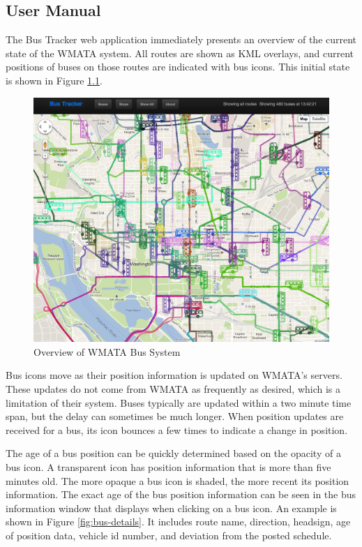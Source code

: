 \documentclass[12pt]{report}
\begin{document}
\begin{appendices}
\chapter{User Manual}

The Bus Tracker web application immediately presents an overview of the current state of the WMATA system.  All routes are shown as KML overlays, and current positions of buses on those routes are indicated with bus icons.  This initial state is shown in Figure \ref{fig:busOverview}.

\begin{figure}[ht]
  \centerline{\includegraphics[width=\textwidth]{bus-tracker-overview.png}}
  \caption{Overview of WMATA Bus System}
  \label{fig:busOverview}
\end{figure}


Bus icons move as their position information is updated on WMATA's servers.  These updates do not come from WMATA as frequently as desired, which is a limitation of their system.  Buses typically are updated within a two minute time span, but the delay can sometimes be much longer.  When position updates are received for a bus, its icon bounces a few times to indicate a change in position.  

The age of a bus position can be quickly determined based on the opacity of a bus icon.  A transparent icon has position information that is more than five minutes old.  The more opaque a bus icon is shaded, the more recent its position information.  The exact age of the bus position information can be seen in the bus information window that displays when clicking on a bus icon.  An example is shown in Figure \ref{fig:bus-details}.  It includes route name, direction, headsign, age of position data, vehicle id number, and deviation from the posted schedule.


\end{appendices}
\end{document}

